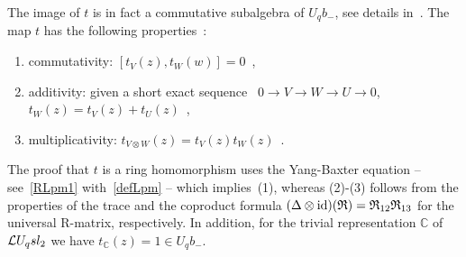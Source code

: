 \documentclass[11pt]{amsart}
\numberwithin{equation}{section}
\numberwithin{equation}{section}
\begin{document}
         The image of $t$ is in fact a commutative subalgebra of $U_qb_-$, see details in~\cite[Prop.\,2]{FR99}. The map $t$ has the following properties~\cite[Lem.\,2]{FR99}:   
 \begin{enumerate}
\item commutativity: $[t_V(z),t_W(w)]=0$\ ,
\item additivity: given a short exact sequence \ $0 \rightarrow V \rightarrow W \rightarrow U \rightarrow 0$, $t_{W}(z) = t_V(z)+t_U(z)$\ ,
\item multiplicativity: $t_{V\otimes W}(z) = t_V(z)t_W(z)$\ .
 \end{enumerate}
 The proof that $t$ is a ring homomorphism uses the Yang-Baxter equation -- see~\eqref{RLpm1} with~\eqref{defLpm} -- which implies~(1), whereas (2)-(3) follows from  the properties of the trace and the coproduct formula $(\Delta \otimes \mathrm{id})(\mathfrak R)={\mathfrak R}_{12}{\mathfrak R}_{13}$ for the universal R-matrix, respectively. In addition, for the trivial representation $\mathbb C$ of $\mathcal{L} U_q sl_2$ we have $t_{{\mathbb C}}(z)=1 \in U_qb_-$.
 
\end{document}
